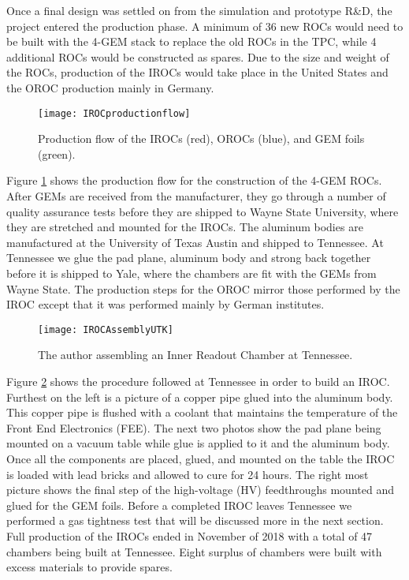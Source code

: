 Once a final design was settled on from the simulation and prototype R\&D, the project entered the production phase.  A minimum of 36 new ROCs would need to be built with the 4-GEM stack to replace the old ROCs in the TPC, while 4 additional ROCs would be constructed as spares.  Due to the size and weight of the ROCs, production of the IROCs would take place in the United States and the OROC production mainly in Germany. 

\begin{figure}[h]
\texttt{[image: IROCproductionflow]}
\centering
\caption{Production flow of the IROCs (red), OROCs (blue), and GEM foils (green)\cite{Dick2017QM}. }
\label{fig:IROCprod}
\end{figure}

\noindent
Figure \ref{fig:IROCprod} shows the production flow for the construction of the 4-GEM ROCs.  After GEMs are received from the manufacturer, they go through a number of quality assurance tests before they are shipped to Wayne State University, where they are stretched and mounted for the IROCs.   The aluminum bodies are manufactured at the University of Texas Austin and shipped to Tennessee.  At Tennessee we glue the pad plane, aluminum body and strong back together before it is shipped to Yale, where the chambers are fit with the GEMs from Wayne State.  The production steps for the OROC mirror those performed by the IROC except that it was performed mainly by German institutes.

\begin{figure}[h!]
\texttt{[image: IROCAssemblyUTK]}
\centering
\caption{The author assembling an Inner Readout Chamber at Tennessee. }
\label{fig:IROCassm}
\end{figure}

Figure \ref{fig:IROCassm} shows the procedure followed at Tennessee in order to build an IROC.  Furthest on the left is a picture of a copper pipe glued into the aluminum body.  This copper pipe is flushed with a coolant that maintains the temperature of the Front End Electronics (FEE).  The next two photos show the pad plane being mounted on a vacuum table while glue is applied to it and the aluminum body.  Once all the components are placed, glued, and mounted on the table the IROC is loaded with lead bricks and allowed to cure for 24 hours.  The right most picture shows the final step of the high-voltage (HV) feedthroughs mounted and glued for the GEM foils.  Before a completed IROC leaves Tennessee we performed a gas tightness test that will be discussed more in the next section.  Full production of the IROCs ended in November of 2018 with a total of 47 chambers being built at Tennessee.  Eight surplus of chambers were built with excess materials to provide spares.

